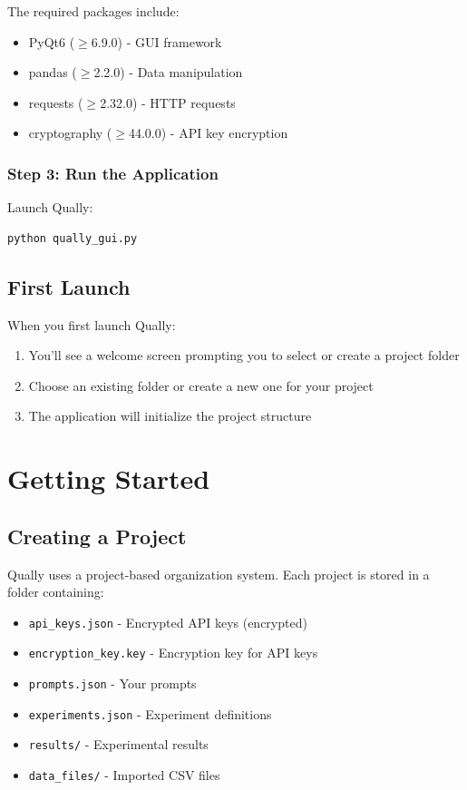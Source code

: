 \documentclass[11pt,a4paper]{article}
\begin{document}
The required packages include:
\begin{itemize}
    \item PyQt6 ($\geq$6.9.0) - GUI framework
    \item pandas ($\geq$2.2.0) - Data manipulation
    \item requests ($\geq$2.32.0) - HTTP requests
    \item cryptography ($\geq$44.0.0) - API key encryption
\end{itemize}

\subsubsection{Step 3: Run the Application}
Launch Qually:
\begin{lstlisting}[language=bash]
python qually_gui.py
\end{lstlisting}

\subsection{First Launch}
When you first launch Qually:
\begin{enumerate}
    \item You'll see a welcome screen prompting you to select or create a project folder
    \item Choose an existing folder or create a new one for your project
    \item The application will initialize the project structure
\end{enumerate}

\section{Getting Started}
\label{sec:getting_started}

\subsection{Creating a Project}
Qually uses a project-based organization system. Each project is stored in a folder containing:
\begin{itemize}
    \item \texttt{api\_keys.json} - Encrypted API keys (encrypted)
    \item \texttt{encryption\_key.key} - Encryption key for API keys
    \item \texttt{prompts.json} - Your prompts
    \item \texttt{experiments.json} - Experiment definitions
    \item \texttt{results/} - Experimental results
    \item \texttt{data\_files/} - Imported CSV files
\end{itemize}
\end{document}
